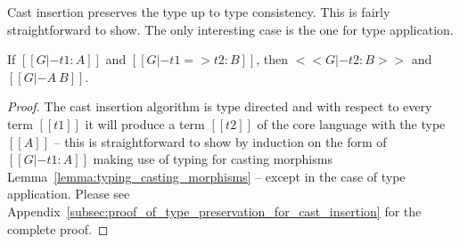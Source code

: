 Cast insertion preserves the type up to type consistency.  This is
fairly straightforward to show.  The only interesting case is the one
for type application.
\begin{lemma}
  \label{lemma:type_preservation_for_cast_insertion}
  If $[[G |- t1 : A]]$ and $[[G |- t1 => t2 : B]]$, then $<<G |- t2 : B>>$ and $[[G |- A ~ B]]$.
\end{lemma}
\begin{proof}
  The cast insertion algorithm is type directed and with respect to
  every term $[[t1]]$ it will produce a term $[[t2]]$ of the core
  language with the type $[[A]]$ -- this is straightforward to show by
  induction on the form of $[[G |- t1 : A]]$ making use of typing for
  casting morphisms Lemma~\ref{lemma:typing_casting_morphisms} --
  except in the case of type application.  Please see
  Appendix~\ref{subsec:proof_of_type_preservation_for_cast_insertion}
  for the complete proof.
\end{proof}

